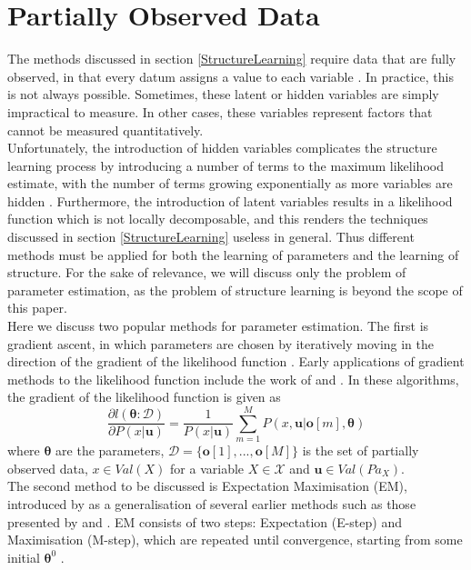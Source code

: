 \documentclass [11pt]{article}
\begin{document}
\section{Partially Observed Data}\label{PartiallyObservedData}
The methods discussed in section \ref{StructureLearning} require data that are fully observed, in that every datum assigns a value to each variable \citep{koller09}. In practice, this is not always possible. Sometimes, these latent or hidden variables are simply impractical to measure. In other cases, these variables represent factors that cannot be measured quantitatively. 
\\
Unfortunately, the introduction of hidden variables complicates the structure learning process by introducing a number of terms to the maximum likelihood estimate, with the number of terms growing exponentially as more variables are hidden \citep{koller09}. Furthermore, the introduction of latent variables results in a likelihood function which is not locally decomposable, and this renders the techniques discussed in section \ref{StructureLearning} useless in general. Thus different methods must be applied for both the learning of parameters and the learning of structure. For the sake of relevance, we will discuss only the problem of parameter estimation, as the problem of structure learning is beyond the scope of this paper.
\\
Here we discuss two popular methods for parameter estimation. The first is gradient ascent, in which parameters are chosen by iteratively moving in the direction of the gradient of the likelihood function \citep{koller09}. Early applications of gradient methods to the likelihood function include the work of \cite{thiesson95} and \cite{binder97}. In these algorithms, the gradient of the likelihood function is given as
\begin{equation*}
\frac{\partial l(\boldsymbol{\theta}:\mathcal{D})}{\partial P(x|\boldsymbol{u})} = \frac{1}{P(x|\boldsymbol{u})}\sum_{m=1}^{M}P(x,\boldsymbol{u}|\boldsymbol{o}[m],\boldsymbol{\theta})
\end{equation*}
where $\boldsymbol{\theta}$ are the parameters, $\mathcal{D} = \{\boldsymbol{o}[1],...,\boldsymbol{o}[M]\}$ is the set of partially observed data, $x \in Val(X)$ for a variable $X \in \mathcal{X}$ and $\boldsymbol{u} \in Val(Pa_{X})$\citep{koller09}.
\\
The second method to be discussed is Expectation Maximisation (EM), introduced by \cite{dempster77} as a generalisation of several earlier methods such as those presented by \cite{baum70} and \cite{orchard72}. EM consists of two steps: Expectation (E-step) and Maximisation (M-step), which are repeated until convergence, starting from some initial $\boldsymbol{\theta}^{0}$  \citep{koller09}. 
\end{document}
